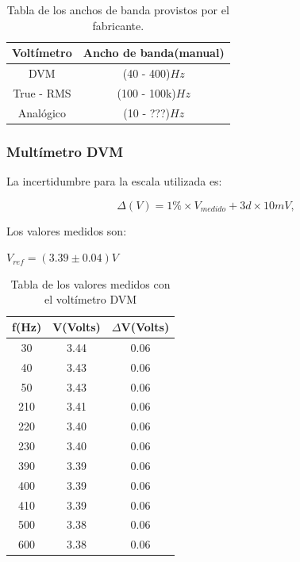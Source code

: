 \documentclass{article}
\begin{document}
\begin{table}[!hbt]
	\begin{center}
	\begin{tabular}{|c|c|}\hline
	\textbf{Voltímetro} & \textbf{Ancho de banda(manual)}\\ \hline
    DVM &  (40 - 400)$Hz$\\ \hline
    True - RMS &  (100 - 100k)$Hz$\\ \hline
    Analógico &  (10 - ???)$Hz$\\ \hline
	\end{tabular}
	\caption{Tabla de los anchos de banda provistos por el fabricante.}
	\end{center}
\end{table}



\subsubsection{Multímetro DVM}

La incertidumbre para la escala utilizada es:

\begin{equation}
 	\Delta(V) = 1\%\times V_{medido} + 3d\times 10mV,
\end{equation}
\medskip

Los valores medidos son:

\begin{center}
$V_{ref} = (3.39 \pm 0.04) V$
\end{center}

\begin{table}[!hbt]
	\begin{center}
	\begin{tabular}{|c|c|c|}\hline
	\textbf{f(Hz)} & \textbf{V(Volts)} & \textbf{$\Delta$V(Volts)} \\ \hline

	30 & 3.44 &  0.06	\\ \hline
    40 & 3.43 &	0.06\\ \hline
    50 & 3.43 &	0.06\\ \hline
	210 & 3.41 & 0.06\\ \hline
	220 & 3.40 & 0.06\\ \hline
	230 & 3.40 & 0.06\\ \hline
	390 & 3.39 & 0.06\\ \hline
	400 & 3.39 & 0.06\\ \hline
	410 & 3.39 & 0.06\\	 \hline
	500 & 3.38 & 0.06\\ \hline
	600 & 3.38 & 0.06\\ \hline
	\end{tabular}
	\caption{Tabla de los valores medidos con el voltímetro DVM}
	\end{center}
\end{table}
\bigskip
\end{document}
